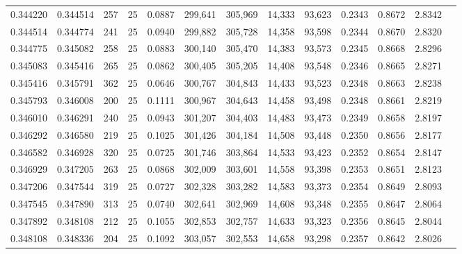 \begin{tabular}{rrrrrrrrrrrrr}
0.344220 & 0.344514 &   257 &  25 &                                     0.0887 & 299,641 & 305,969 &  14,333 &  93,623 & 0.2343 & 0.8672 & 2.8342 \\
0.344514 & 0.344774 &   241 &  25 &                                     0.0940 & 299,882 & 305,728 &  14,358 &  93,598 & 0.2344 & 0.8670 & 2.8320 \\
0.344775 & 0.345082 &   258 &  25 &                                     0.0883 & 300,140 & 305,470 &  14,383 &  93,573 & 0.2345 & 0.8668 & 2.8296 \\
0.345083 & 0.345416 &   265 &  25 &                                     0.0862 & 300,405 & 305,205 &  14,408 &  93,548 & 0.2346 & 0.8665 & 2.8271 \\
0.345416 & 0.345791 &   362 &  25 &                                     0.0646 & 300,767 & 304,843 &  14,433 &  93,523 & 0.2348 & 0.8663 & 2.8238 \\
0.345793 & 0.346008 &   200 &  25 &                                     0.1111 & 300,967 & 304,643 &  14,458 &  93,498 & 0.2348 & 0.8661 & 2.8219 \\
0.346010 & 0.346291 &   240 &  25 &                                     0.0943 & 301,207 & 304,403 &  14,483 &  93,473 & 0.2349 & 0.8658 & 2.8197 \\
0.346292 & 0.346580 &   219 &  25 &                                     0.1025 & 301,426 & 304,184 &  14,508 &  93,448 & 0.2350 & 0.8656 & 2.8177 \\
0.346582 & 0.346928 &   320 &  25 &                                     0.0725 & 301,746 & 303,864 &  14,533 &  93,423 & 0.2352 & 0.8654 & 2.8147 \\
0.346929 & 0.347205 &   263 &  25 &                                     0.0868 & 302,009 & 303,601 &  14,558 &  93,398 & 0.2353 & 0.8651 & 2.8123 \\
0.347206 & 0.347544 &   319 &  25 &                                     0.0727 & 302,328 & 303,282 &  14,583 &  93,373 & 0.2354 & 0.8649 & 2.8093 \\
0.347545 & 0.347890 &   313 &  25 &                                     0.0740 & 302,641 & 302,969 &  14,608 &  93,348 & 0.2355 & 0.8647 & 2.8064 \\
0.347892 & 0.348108 &   212 &  25 &                                     0.1055 & 302,853 & 302,757 &  14,633 &  93,323 & 0.2356 & 0.8645 & 2.8044 \\
0.348108 & 0.348336 &   204 &  25 &                                     0.1092 & 303,057 & 302,553 &  14,658 &  93,298 & 0.2357 & 0.8642 & 2.8026 \\

\end{tabular}
